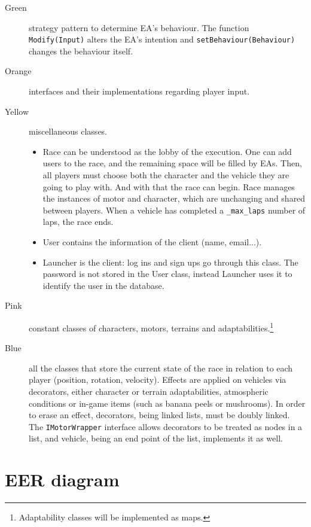 \documentclass[12pt,a4paper]{article}
\begin{document}
\begin{description}
    \item[Green] strategy pattern to determine EA's behaviour. The function \texttt{Modify(Input)} alters the EA's intention and \texttt{setBehaviour(Behaviour)} changes the behaviour itself.
    \item[Orange] interfaces and their implementations regarding player input.
    \item[Yellow] miscellaneous classes.
    \begin{itemize}
        \item Race can be understood as the lobby of the execution. One can add users to the race, and the remaining space will be filled by EAs. Then, all players must choose both the character and the vehicle they are going to play with. And with that the race can begin. Race manages the instances of motor and character, which are unchanging and shared between players. When a vehicle has completed a \texttt{_max_laps} number of laps, the race ends.
        \item User contains the information of the client (name, email...).
        \item Launcher is the client: log ins and sign ups go through this class. The password is not stored in the User class, instead Launcher uses it to identify the user in the database.
    \end{itemize}
    \item[Pink] constant classes of characters, motors, terrains and adaptabilities.\footnote{Adaptability classes will be implemented as maps.}
    \item[Blue] all the classes that store the current state of the race in relation to each player (position, rotation, velocity). Effects are applied on vehicles via decorators, either character or terrain adaptabilities, atmospheric conditions or in-game items (such as banana peels or mushrooms). In order to erase an effect, decorators, being linked lists, must be doubly linked. The \texttt{IMotorWrapper} interface allows decorators to be treated as nodes in a list, and vehicle, being an end point of the list, implements it as well.
\end{description}

\newpage

\section{EER diagram}
\end{document}
